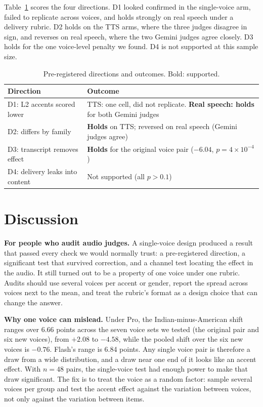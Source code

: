 Table~\ref{tab:prereg} scores the four directions. D1 looked confirmed in the single-voice arm, failed to replicate across voices, and holds strongly on real speech under a delivery rubric. D2 holds on the TTS arms, where the three judges disagree in sign, and reverses on real speech, where the two Gemini judges agree closely. D3 holds for the one voice-level penalty we found. D4 is not supported at this sample size.

\begin{table}[t]
\small
\centering
\begin{tabular}{>{\raggedright\arraybackslash}p{2.9cm}>{\raggedright\arraybackslash}p{4.6cm}}
\toprule
Direction & Outcome \\
\midrule
D1: L2 accents scored lower & TTS: one cell, did not replicate. \textbf{Real speech: holds} for both Gemini judges \\
D2: differs by family & \textbf{Holds} on TTS; reversed on real speech (Gemini judges agree) \\
D3: transcript removes effect & \textbf{Holds} for the original voice pair ($-6.04$, $p=4\times10^{-4}$) \\
D4: delivery leaks into content & Not supported (all $p>0.1$) \\
\bottomrule
\end{tabular}
\caption{Pre-registered directions and outcomes. Bold: supported.}
\label{tab:prereg}
\end{table}

\section{Discussion}
\label{sec:discussion}

\textbf{For people who audit audio judges.} A single-voice design produced a result that passed every check we would normally trust: a pre-registered direction, a significant test that survived correction, and a channel test locating the effect in the audio. It still turned out to be a property of one voice under one rubric. Audits should use several voices per accent or gender, report the spread across voices next to the mean, and treat the rubric's format as a design choice that can change the answer.

\textbf{Why one voice can mislead.} Under Pro, the Indian-minus-American shift ranges over 6.66 points across the seven voice sets we tested (the original pair and six new voices), from $+2.08$ to $-4.58$, while the pooled shift over the six new voices is $-0.76$. Flash's range is 6.84 points. Any single voice pair is therefore a draw from a wide distribution, and a draw near one end of it looks like an accent effect. With $n=48$ pairs, the single-voice test had enough power to make that draw significant. The fix is to treat the voice as a random factor: sample several voices per group and test the accent effect against the variation between voices, not only against the variation between items.

